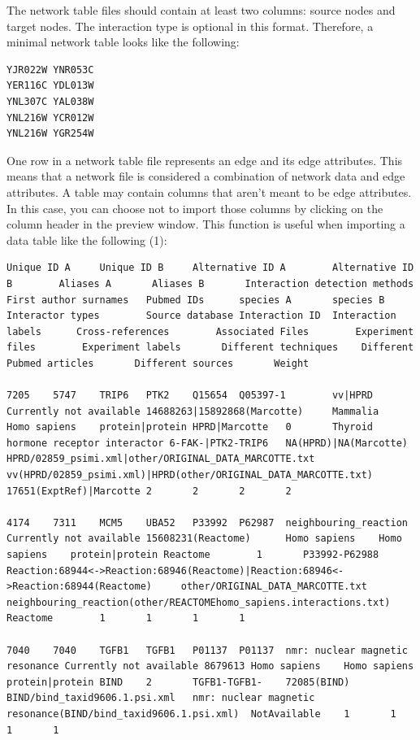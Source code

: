  The network table files should contain at least two columns: source nodes and target nodes. The interaction type is optional in this format. Therefore, a minimal network table looks like the following: 


 \begin{verbatim}
YJR022W YNR053C
YER116C YDL013W
YNL307C YAL038W
YNL216W YCR012W
YNL216W YGR254W

\end{verbatim}



 One row in a network table file represents an edge and its edge attributes. This means that a network file is considered a combination of network data and edge attributes. A table may contain columns that aren't meant to be edge attributes. In this case, you can choose not to import those columns by clicking on the column header in the preview window. This function is useful when importing a data table like the following (1): 
\begin{verbatim}
Unique ID A     Unique ID B     Alternative ID A        Alternative ID B        Aliases A       Aliases B       Interaction detection methods   First author surnames   Pubmed IDs      species A       species B       Interactor types        Source database Interaction ID  Interaction labels      Cross-references        Associated Files        Experiment files        Experiment labels       Different techniques    Different Pubmed articles       Different sources       Weight

7205    5747    TRIP6   PTK2    Q15654  Q05397-1        vv|HPRD Currently not available 14688263|15892868(Marcotte)     Mammalia        Homo sapiens    protein|protein HPRD|Marcotte   0       Thyroid hormone receptor interactor 6-FAK-|PTK2-TRIP6   NA(HPRD)|NA(Marcotte)   HPRD/02859_psimi.xml|other/ORIGINAL_DATA_MARCOTTE.txt   vv(HPRD/02859_psimi.xml)|HPRD(other/ORIGINAL_DATA_MARCOTTE.txt) 17651(ExptRef)|Marcotte 2       2       2       2

4174    7311    MCM5    UBA52   P33992  P62987  neighbouring_reaction   Currently not available 15608231(Reactome)      Homo sapiens    Homo sapiens    protein|protein Reactome        1       P33992-P62988   Reaction:68944<->Reaction:68946(Reactome)|Reaction:68946<->Reaction:68944(Reactome)     other/ORIGINAL_DATA_MARCOTTE.txt        neighbouring_reaction(other/REACTOMEhomo_sapiens.interactions.txt)      Reactome        1       1       1       1

7040    7040    TGFB1   TGFB1   P01137  P01137  nmr: nuclear magnetic resonance Currently not available 8679613 Homo sapiens    Homo sapiens    protein|protein BIND    2       TGFB1-TGFB1-    72085(BIND)     BIND/bind_taxid9606.1.psi.xml   nmr: nuclear magnetic resonance(BIND/bind_taxid9606.1.psi.xml)  NotAvailable    1       1       1       1

\end{verbatim}


